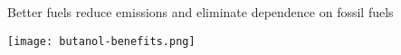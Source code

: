 \documentclass{beamer}
\begin{document}
\begin{frame}{Better fuels reduce emissions and eliminate dependence on fossil fuels}
    \begin{center}
        \texttt{[image: butanol-benefits.png]}
    \end{center}
\end{frame}
\end{document}
